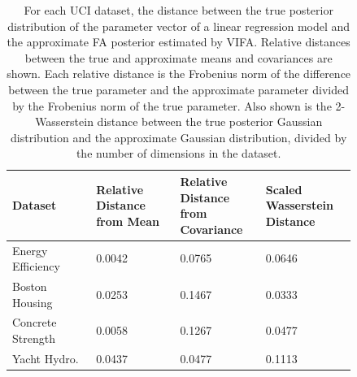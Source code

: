 \documentclass[msc,deptreport.inf]{infthesis} %
\begin{document}
\begin{table}[h!]
	\begin{center}
		\begin{tabular}{|| p{0.21\linewidth} p{0.21\linewidth} p{0.21\linewidth} p{0.21\linewidth} ||} 
 			\hline
 			Dataset & Relative Distance from Mean & Relative Distance from Covariance & Scaled Wasserstein Distance \\ [0.5ex] 
 			\hline\hline
			Energy Efficiency 	& 0.0042 	& 0.0765 & 0.0646 \\ 
			\hline
			Boston Housing 	& 0.0253 	& 0.1467 & 0.0333 \\ 
			\hline
			Concrete Strength 	& 0.0058 	& 0.1267 & 0.0477 \\ 
			\hline
 			Yacht Hydro. 		& 0.0437 	& 0.0477 & 0.1113 \\ [1ex] 
			\hline
		\end{tabular}
		\caption{For each UCI dataset, the distance between the true posterior distribution of the parameter vector of a linear regression model and the approximate FA posterior estimated by VIFA. Relative distances between the true and approximate means and covariances are shown. Each relative distance is the Frobenius norm of the difference between the true parameter and the approximate parameter divided by the Frobenius norm of the true parameter. Also shown is the 2-Wasserstein distance between the true posterior Gaussian distribution and the approximate Gaussian distribution, divided by the number of dimensions in the dataset.}
		\label{table:linear_regression_vi_posterior_uci}
	\end{center}
\end{table}
\end{document}
